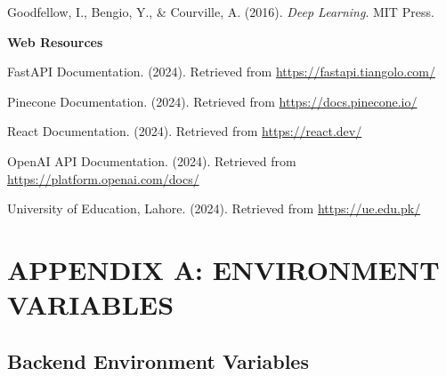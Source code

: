 \documentclass[12pt,a4paper]{book}
\numberwithin{table}{chapter}
\numberwithin{figure}{chapter}
\numberwithin{equation}{chapter}
\begin{document}
\bigskip
[6] Goodfellow, I., Bengio, Y., \& Courville, A. (2016). \textit{Deep Learning}. MIT Press.

\bigskip
\textbf{Web Resources}

\bigskip
[7] FastAPI Documentation. (2024). Retrieved from \url{https://fastapi.tiangolo.com/}

\bigskip
[8] Pinecone Documentation. (2024). Retrieved from \url{https://docs.pinecone.io/}

\bigskip
[9] React Documentation. (2024). Retrieved from \url{https://react.dev/}

\bigskip
[10] OpenAI API Documentation. (2024). Retrieved from \url{https://platform.openai.com/docs/}

\bigskip
[11] University of Education, Lahore. (2024). Retrieved from \url{https://ue.edu.pk/}

\clearpage

\appendix
\chapter{APPENDIX A: ENVIRONMENT VARIABLES}

\section{Backend Environment Variables}
\end{document}
